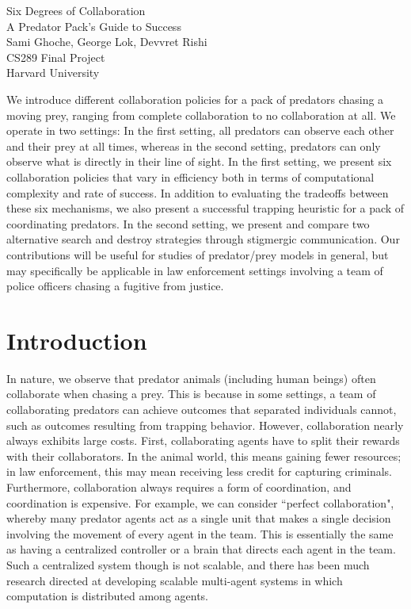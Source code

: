 \documentclass[11pt]{article}
\renewenvironment{abstract}
 {\small
  \begin{center}
  \bfseries \abstractname\vspace{-.5em}\vspace{0pt}
  \end{center}
  \list{}{%
    \setlength{\leftmargin}{0in}%
    \setlength{\rightmargin}{\leftmargin}%
  }%
  \item\relax}
 {\endlist}
\begin{document}
{
\vspace*{25px}
 \centering
 \LARGE Six Degrees of Collaboration \\ A Predator Pack's Guide to Success \\[1.5em]
 \large Sami Ghoche,
        George Lok,
        Devvret Rishi\\[1em]

        
	CS289 Final Project\\
	
	Harvard University
	
\vspace{75px}
}
\begin{multicols}{2}

\begin{abstract}

We introduce different collaboration policies for a pack of predators chasing a moving prey, ranging from complete collaboration to no collaboration at all. We operate in two settings: In the first setting, all predators can observe each other and their prey at all times, whereas in the second setting, predators can only observe what is directly in their line of sight. In the first setting, we present six collaboration policies that vary in efficiency both in terms of computational complexity and rate of success. In addition to evaluating the tradeoffs between these six mechanisms, we also present a successful trapping heuristic for a pack of coordinating predators. In the second setting, we present and compare two alternative search and destroy strategies through stigmergic communication. Our contributions will be useful for studies of predator/prey models in general, but may specifically be applicable in law enforcement settings involving a team of police officers chasing a fugitive from justice. 

\end{abstract}

\section{Introduction}
In nature, we observe that predator animals (including human beings) often collaborate when chasing a prey. This is because in some settings, a team of collaborating predators can achieve outcomes that separated individuals cannot, such as outcomes resulting from trapping behavior. However, collaboration nearly always exhibits large costs. First, collaborating agents have to split their rewards with their collaborators. In the animal world, this means gaining fewer resources; in law enforcement, this may mean receiving less credit for capturing criminals. Furthermore, collaboration always requires a form of coordination, and coordination is expensive. For example, we can consider ``perfect collaboration", whereby many predator agents act as a single unit that makes a single decision involving the movement of every agent in the team. This is essentially the same as having a centralized controller or a brain that directs each agent in the team. Such a centralized system though is not scalable, and there has been much research directed at developing scalable multi-agent systems in which computation is distributed among agents. 


\end{multicols}
\end{document}
